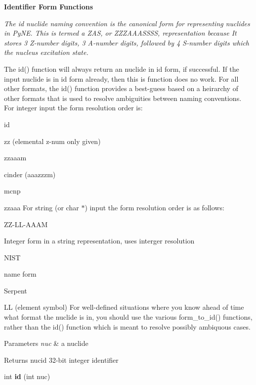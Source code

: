 \begin{Indent}{\bf Identifier Form Functions}\par
{\em The \textquotesingle{}id\textquotesingle{} nuclide naming convention is the canonical form for representing nuclides in Py\+NE. This is termed a Z\+AS, or Z\+Z\+Z\+A\+A\+A\+S\+S\+SS, representation because It stores 3 Z-\/number digits, 3 A-\/number digits, followed by 4 S-\/number digits which the nucleus excitation state.

The id() function will always return an nuclide in id form, if successful. If the input nuclide is in id form already, then this is function does no work. For all other formats, the id() function provides a best-\/guess based on a heirarchy of other formats that is used to resolve ambiguities between naming conventions. For integer input the form resolution order is\+:
\begin{DoxyItemize}
\item id
\item zz (elemental z-\/num only given)
\item zzaaam
\item cinder (aaazzzm)
\item mcnp
\item zzaaa For string (or char $\ast$) input the form resolution order is as follows\+:
\item Z\+Z-\/\+L\+L-\/\+A\+A\+AM
\item Integer form in a string representation, uses interger resolution
\item N\+I\+ST
\item name form
\item Serpent
\item LL (element symbol) For well-\/defined situations where you know ahead of time what format the nuclide is in, you should use the various form\+\_\+to\+\_\+id() functions, rather than the id() function which is meant to resolve possibly ambiquous cases. 
\begin{DoxyParams}{Parameters}
{\em nuc} & a nuclide \\
\hline
\end{DoxyParams}
\begin{DoxyReturn}{Returns}
nucid 32-\/bit integer identifier 
\end{DoxyReturn}

\end{DoxyItemize}}\begin{DoxyCompactItemize}
\item 
int {\bfseries id} (int nuc)\hypertarget{namespacepyne_1_1nucname_a179fb56293a25041720035d6ca7a56c5}{}\label{namespacepyne_1_1nucname_a179fb56293a25041720035d6ca7a56c5}


\end{DoxyCompactItemize}
\end{Indent}
